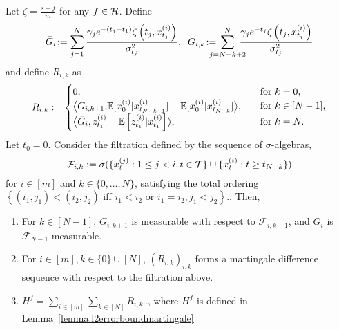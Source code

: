 \begin{lemma}\label{lemma:error_martingale_decomposition_2}
Let $\zeta = \frac{s-f}{m}$ for any $f \in \mathcal{H}$. Define 
\small
\[
\bar{G}_i \!:= \sum_{j=1}^{N} \frac{\gamma_{j}e^{-(t_j-t_1)}\zeta\bb{t_j,x_{t_j}^{(i)}}}{\sigma_{t_j}^{2}}, \;\; 
G_{i,k}\! := \!\!\!\!\!\! \sum_{j=N-k+2}^{N}\!\!\!\!\! \frac{\gamma_{j}e^{-t_j}\zeta\bb{t_j,x_{t_j}^{(i)}}}{\sigma_{t_j}^{2}}
\]
\normalsize
and define $R_{i,k}$ as  
\small
\begin{equation}
    R_{i,k} := 
    \begin{cases} 
        0, & \text{for } k = 0, \\
        \begin{aligned}
            \bigl \langle G_{i,k+1}, 
            & \mathbb{E}[x_0^{(i)} | x_{t_{N-k+1}}^{(i)}]  - \mathbb{E}[x_0^{(i)} | x_{t_{N-k}}^{(i)}] 
            \bigr \rangle, 
        \end{aligned} 
        & \text{for } k \in [N-1], \\
        \bigl\langle \bar{G}_i, z_{t_1}^{(i)} - \mathbb{E}\left[z_{t_1}^{(i)}|x_{t_1}^{(i)}\right] \bigr\rangle, 
        & \text{for } k = N.
    \end{cases} \notag
\end{equation}
\normalsize
Let $t_0 = 0$. Consider the filtration defined by the sequence of $\sigma$-algebras,  
\[
\mathcal{F}_{i,k} := \sigma(\{x_{t}^{(j)} : 1\leq j < i, t \in \mathcal{T}\} \cup \{x_{t}^{(i)} : t \geq t_{N-k}\})
\]
for $i \in [m]$ and $k \in \{0,\dots, N\}$, satisfying the total ordering $\left\{ (i_1, j_1) < (i_2, j_2) \text{ iff } i_1 < i_2 \text{ or } i_1 = i_2, j_1 < j_2 \right\}.$. Then, 
\begin{enumerate}
    \item For $k \in [N-1]$, $G_{i,k+1}$ is measurable with respect to $\mathcal{F}_{i,k-1}$, and $\bar{G}_{i}$ is $\mathcal{F}_{N-1}$-measurable.
    \item For $i \in [m], k \in \{0\} \cup [N]$, $(R_{i,k})_{i,k}$ forms a martingale difference sequence with respect to the filtration above.
    \item $H^{f} = \sum_{i \in [m]}\sum_{k \in [N]}R_{i,k}\,.$, where $H^{f}$ is defined in Lemma~\ref{lemma:l2errorboundmartingale} 
\end{enumerate}
\end{lemma}

